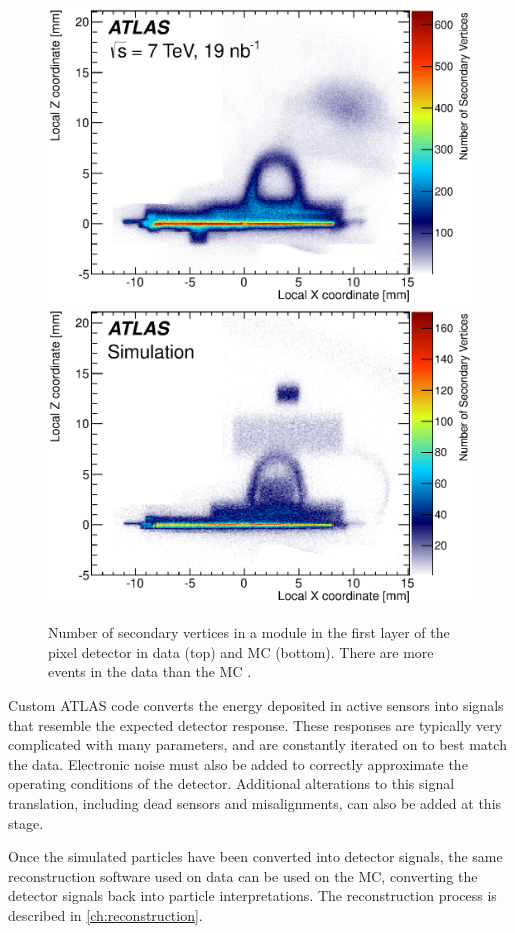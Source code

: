 \begin{centering}
\begin{figure}[!hbt]
\myfloatalign
\includegraphics[width=.9\linewidth]{figures/theory/fig_10a.eps}
\includegraphics[width=.9\linewidth]{figures/theory/fig_10b.eps}
\caption{Number of secondary vertices in a module in the first layer of the pixel detector in data (top) and \ac{MC} (bottom). There are more events in the data than the \ac{MC} \cite{PERF-2015-06}.}
\label{fig:geant}
\end{figure}
\end{centering}

Custom ATLAS code converts the energy deposited in active sensors into signals that resemble the expected detector response. These responses are typically very complicated with many parameters, and are constantly iterated on to best match the data. Electronic noise must also be added to correctly approximate the operating conditions of the detector. Additional alterations to this signal translation, including dead sensors and misalignments, can also be added at this stage. 

Once the simulated particles have been converted into detector signals, the same reconstruction software used on data can be used on the \ac{MC}, converting the detector signals back into particle interpretations. The reconstruction process is described in \autoref{ch:reconstruction}.






